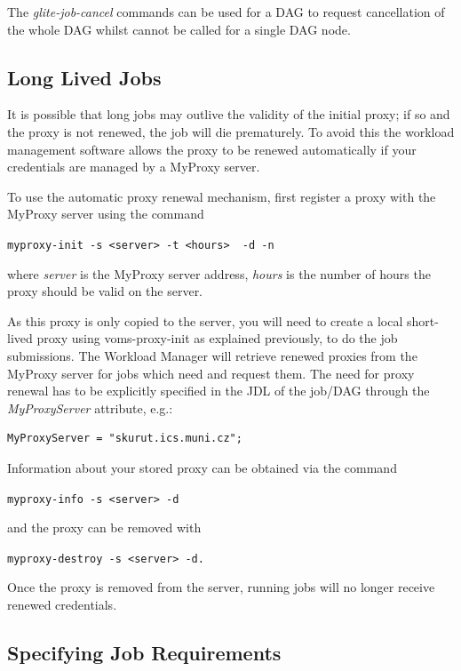 The \emph{glite-job-cancel} commands can be used for a DAG to request cancellation of the whole DAG whilst cannot be 
called for a single DAG node.  


\subsection {Long Lived Jobs}
\label{longjob}

It is possible that long jobs may outlive the validity of the initial proxy; if so and the proxy 
is not renewed, the job will die prematurely. To avoid this the workload management software allows 
the proxy to be renewed automatically if your credentials are managed by a MyProxy server.

To use the automatic proxy renewal mechanism, first register a proxy with the MyProxy server using 
the command

\smallskip
\verb!myproxy-init -s <server> -t <hours>  -d -n!
\smallskip

where \emph{server} is the MyProxy server address, \emph{hours} is the number of hours the proxy should be valid on the 
server.

As this proxy is only copied to the server, you will need to create a local short-lived proxy using 
voms-proxy-init as explained previously, to do the job submissions. The Workload Manager will 
retrieve renewed proxies from the MyProxy server for jobs which need and request them. 
The need for proxy renewal has to be explicitly specified in the JDL of the job/DAG through the 
\emph{MyProxyServer} attribute, e.g.:

\smallskip
\begin{verbatim}
MyProxyServer = "skurut.ics.muni.cz";
\end{verbatim}
\smallskip


Information about your stored proxy can be obtained via the command

\smallskip
\verb!myproxy-info -s <server> -d!
\smallskip

and the proxy can be removed with

\smallskip
\verb!myproxy-destroy -s <server> -d.!
\smallskip

Once the proxy is removed from the server, running jobs will no longer receive renewed credentials.


\subsection{Specifying Job Requirements}

